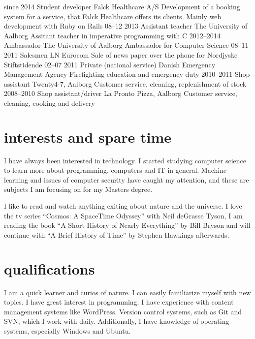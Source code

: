 \documentclass[]{friggeri-cv}
\begin{document}
\begin{entrylist}
  \entry
    {since 2014}
    {Student developer}
    {Falck Healthcare A/S}
    {Development of a booking system for a service, that Falck Healthcare offers its clients. Mainly web development with Ruby on Rails}
  \entry
    {08–12 2013}
    {Assistant teacher}
    {The University of Aalborg}
    {Assitant teacher in imperative programming with C}
  \entry
    {2012–2014}
    {Ambassador}
    {The University of Aalborg}
    {Ambassador for Computer Science}
  \entry
    {08–11 2011}
    {Salesmen}
    {LN Eurocom}
    {Sale of news paper over the phone for Nordjyske Stiftstidende}
  \entry
    {02–07 2011}
    {Private (national service)}
    {Danish Emergency Management Agency}
    {Firefighting education and emergency duty}
  \entry
    {2010–2011}
    {Shop assistant}
    {Twenty4-7, Aalborg}
    {Customer service, cleaning, replenishment of stock}
  \entry
    {2008–2010}
    {Shop assistant/driver}
    {La Pronto Pizza, Aalborg}
    {Customer service, cleaning, cooking and delivery}
\end{entrylist}

\section{interests and spare time}
I have always been interested in technology. I started studying computer science to learn more about programming, computers and IT in general. Machine learning and issues of computer security have caught my attention, and these are subjects I am focusing on for my Masters degree.

I like to read and watch anything exiting about nature and the universe. I love the tv series ``Cosmos: A SpaceTime Odyssey'' with Neil deGrasse Tyson, I am reading the book ``A Short History of Nearly Everything'' by Bill Bryson and will continue with ``A Brief History of Time'' by Stephen Hawkings afterwards.

\section{qualifications}

I am a quick learner and curios of nature. I can easily familiarize myself with new topics. I have great interest in programming. I have experience with content management systems like WordPress. Version control systems, such as Git and SVN, which I work with daily. Additionally, I have knowledge of operating systems, especially Windows and Ubuntu.
\end{document}
